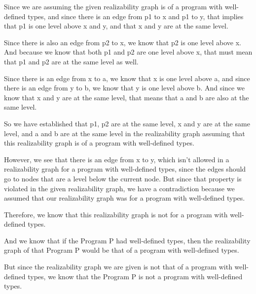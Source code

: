 \documentclass[12pt]{article}
\begin{document}
\begin{enumerate}
\begin{mdframed}
        Since we are assuming the given realizability graph is of a program with well-defined types, and since there is an edge from p1 to x and p1 to y, that implies that p1 is one level above x and y, and that x and y are at the same level.

        Since there is also an edge from p2 to x, we know that p2 is one level above x. And because we know that both p1 and p2 are one level above x, that must mean that p1 and p2 are at the same level as well.

        Since there is an edge from x to a, we know that x is one level above a, and since there is an edge from y to b, we know that y is one level above b. And since we know that x and y are at the same level, that means that a and b are also at the same level.

        So we have established that p1, p2 are at the same level, x and y are at the same level, and a and b are at the same level in the realizability graph assuming that this realizability graph is of a program with well-defined types.

        However, we see that there is an edge from x to y, which isn't allowed in a realizability graph for a program with well-defined types, since the edges should go to nodes that are a level below the current node. But since that property is violated in the given realizability graph, we have a contradiction because we assumed that our realizability graph was for a program with well-defined types.

        Therefore, we know that this realizability graph is not for a program with well-defined types.

        And we know that if the Program P had well-defined types, then the realizability graph of that Program P would be that of a program with well-defined types.

        But since the realizability graph we are given is not that of a program with well-defined types, we know that the Program P is not a program with well-defined types.
       \end{mdframed}
    

    \end{enumerate}
    
\end{document}
